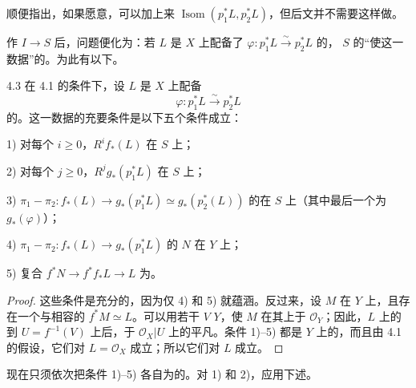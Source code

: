 顺便指出，如果愿意，可以加上来 $\operatorname{Isom}(p_1^*L,p_2^*L)$，但后文并不需要这样做。

作 $I\to S$ 后，问题便化为：若 $L$ 是 $X$ 上配备了 $\varphi:p_1^*L\xrightarrow\sim p_2^*L$ 的， $S$ 的“使这一数据”的。为此有以下。

\begin{SGAresult}{}{4.3}
在 4.1 的条件下，设 $L$ 是 $X$ 上配备
\[
\varphi:p_1^*L\xrightarrow\sim p_2^*L
\]
的。这一数据的充要条件是以下五个条件成立：

\textup{1)} 对每个 $i\geq0$，$R^if_*(L)$ 在 $S$ 上；

\textup{2)} 对每个 $j\geq0$，$R^jg_*(p_1^*L)$ 在 $S$ 上；

\textup{3)} $\pi_1-\pi_2:f_*(L)\to g_*(p_1^*L)\simeq g_*(p_2^*(L))$ 的在 $S$ 上（其中最后一个为 $g_*(\varphi)$）；

\textup{4)} $\pi_1-\pi_2:f_*(L)\to g_*(p_1^*L)$ 的 $N$ 在 $Y$ 上；

\textup{5)} 复合 $f^*N\to f^*f_*L\to L$ 为。
\end{SGAresult}
\begin{proof}
这些条件是充分的，因为仅 4) 和 5) 就蕴涵。反过来，设 $M$ 在 $Y$ 上，且存在一个与相容的 $f^*M\simeq L$。可以用若干 $V$  $Y$，使 $M$ 在其上于 $\mathcal O_Y$；因此，$L$ 上的到 $U=f^{-1}(V)$ 上后，于 $\mathcal O_X|U$ 上的平凡。条件 1)--5) 都是 $Y$ 上的，而且由 4.1 的假设，它们对 $L=\mathcal O_X$ 成立；所以它们对 $L$ 成立。
\end{proof}
现在只须依次把条件 1)--5) 各自为的。对 1) 和 2)，应用下述。

